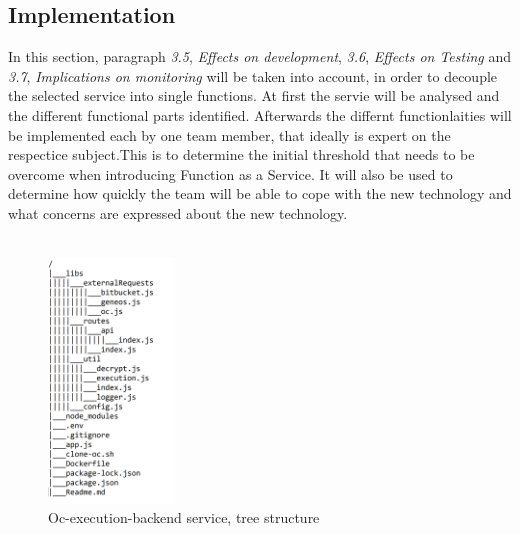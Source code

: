 \documentclass[a4paper,twoside,11pt, pagesize]{scrartcl}
\begin{document}
\begin{spacing}{1.2}
\subsection{Implementation}
In this section, paragraph \textit{3.5}, \textit{Effects on development}, \textit{3.6}, \textit{Effects on Testing} and \textit{3.7}, \textit{Implications on monitoring} will be taken into account, in order to decouple the selected service into single functions. At first the servie will be analysed and the different functional parts identified. Afterwards the differnt functionlaities will be implemented each by one team member, that ideally is expert on the respectice subject.This is to determine the initial threshold that needs to be overcome when introducing Function as a Service. It will also be used to determine how quickly the team will be able to cope with the new technology and what concerns are expressed about the new technology.\\\\
\begin{figure}[H]
\label{fig:tree}
\centering
\includegraphics[width=0.3\textwidth]{tree.png}
\caption{Oc-execution-backend service, tree structure}
\end{figure}

\end{spacing}
\end{document}

